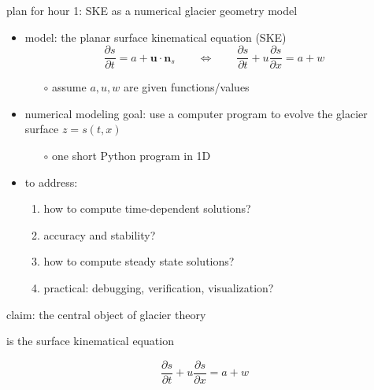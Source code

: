 \documentclass[10pt,dvipsnames]{beamer}
\newcommand{\bn}{\mathbf{n}}
\newcommand{\bu}{\mathbf{u}}
\begin{document}
\begin{frame}{plan for hour 1: SKE as a numerical glacier geometry model}

\begin{itemize}
\item \alert{model:} the planar surface kinematical equation (SKE)
\begin{equation*}
\frac{\partial s}{\partial t} = a + \bu \cdot \bn_s \qquad \iff \qquad \frac{\partial s}{\partial t} + u \frac{\partial s}{\partial x} = a + w
\end{equation*}

    \begin{itemize}
    \item[$\circ$] assume $a,u,w$ are given functions/values 
    \end{itemize}
\item \alert{numerical modeling goal:} use a computer program to evolve the glacier surface $z=s(t,x)$
    \begin{itemize}
    \item[$\circ$] one short Python program in 1D
    \end{itemize}
\item \alert{to address:}
     \begin{enumerate}
     \item how to compute time-dependent solutions?
     \item accuracy and stability?
     \item how to compute steady state solutions?
     \item practical: debugging, verification, visualization?
     \end{enumerate}
\end{itemize}
\end{frame}


\begin{frame}[standout]
claim: the central object of glacier theory

is the surface kinematical equation

\begin{equation*}
\frac{\partial s}{\partial t} + u \frac{\partial s}{\partial x} = a + w
\end{equation*}
\end{frame}
\end{document}

